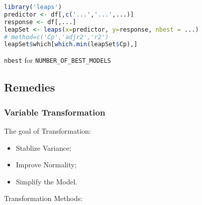 \begin{rcode}
\begin{lstlisting}[language=R]
library('leaps')
predictor <- df[,c('...','...',...)]
response <- df[,...]
leapSet <- leaps(x=predictor, y=response, nbest = ...)
# method=c('Cp','adjr2','r2')
leapSet$which[which.min(leapSet$Cp),]
\end{lstlisting}
    
    \lstinline|nbest| for \lstinline|NUMBER_OF_BEST_MODELS|
\end{rcode}





















\subsection{Remedies}

\subsubsection{Variable Transformation}\label{SubSubSectionVarianceStablizeTransformation}
    The goal of Transformation:
        
        \begin{itemize}[topsep=2pt,itemsep=2pt]
            \item Stablize Variance;
            \item Improve Normality;
            \item Simplify the Model.
        \end{itemize}
    
    \begin{point}
        Transformation Methods:
    \end{point}
    
